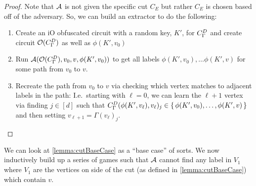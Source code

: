 \begin{lemma}
\begin{proof}
		Note that $\mathcal{A}$ is not given the specific cut $C_E$ but rather $C_E$ is chosen based off of the adversary.
		So, we can build an extractor to do the following:
		\begin{enumerate}
			\item Create an iO obfuscated circuit with a random key, $K'$, for ${C_\Gamma^D}$ and create circuit $\mathcal{O}({C_\Gamma^D})$
			      as well as $\phi(K', v_0)$
			\item Run $\mathcal{A}(\mathcal{O}({C_\Gamma^D}), v_0, v, \phi(K', v_0))$ to get all labels $\phi(K', v_0), \dots \phi(K', v)$
			      for some path from $v_0$ to $v$.
			\item Recreate the path from $v_0$ to $v$ via checking which vertex matches to adjacent labels in the path:
			      I.e.\ starting with $\ell = 0$, we can learn the $\ell + 1$ vertex via finding $j \in [d]$ such that
			      ${C_\Gamma^D}(\phi(K', v_\ell), v_\ell)_j \in \set{\phi(K', v_0), \dots, \phi(K', v)}$
			      and then setting $v_{\ell + 1} = \Gamma(v_\ell)_j$.
		\end{enumerate}
	\end{proof}
\end{lemma}

We can look at \cref{lemma:cutBaseCase} as a ``base case'' of sorts. We now inductively build up a series of games
such that $\mathcal{A}$ cannot find any label in $V_1$ where $V_1$ are the vertices on side of the cut (as defined in \cref{lemma:cutBaseCase})
which contain $v$.


